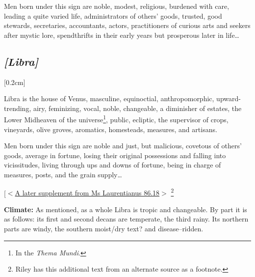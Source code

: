 Men born under this sign are noble, modest, religious, burdened with care, leading a quite varied life, administrators of others’ goods, trusted, good stewards, secretaries, accountants, actors, practitioners of curious arts and seekers after mystic lore, spendthrifts in their early years but prosperous later in life\ldots 

\secbr
\subsection{\textit{[Libra]}}
[0.2cm]

Libra is the house of Venus, masculine, equinoctial, anthropomorphic, upward-trending, airy, feminizing, vocal, noble, changeable, a diminisher of estates, the Lower Midheaven of the universe\footnote{In the \textit{Thema Mundi}.}, public, ecliptic, the supervisor of crops, vineyards, olive groves, aromatics, homesteads, measures, and artisans.

Men born under this sign are noble and just, but malicious, covetous of others’ goods, average in fortune, losing their original possessions and falling into vicissitudes, living through ups and downs of fortune, being in charge of measures, posts, and the grain supply\ldots

\noindent
[\underline{$<$A later supplement from Ms Laurentianus 86.18$>$}
\footnote{Riley has this additional text from an alternate source as a footnote.}  

\textbf{Climate:} As mentioned, as a whole Libra is tropic and changeable. By part it is as follows: its first and second decans are temperate, the third rainy. Its northern
parts are windy, the southern moist/dry text? and disease–ridden. 

